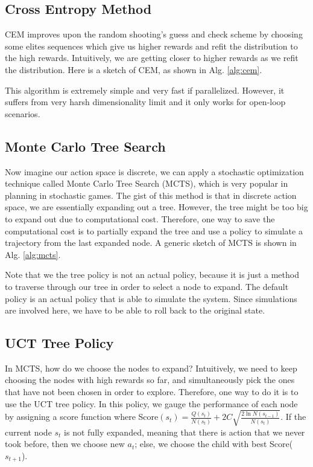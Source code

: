 \subsection{Cross Entropy Method}
CEM improves upon the random shooting's guess and check scheme by choosing some elites sequences which give us higher rewards and refit the distribution to the high rewards. Intuitively, we are getting closer to higher rewards as we refit the distribution. Here is a sketch of CEM, as shown in Alg. \ref{alg:cem}.

This algorithm is extremely simple and very fast if parallelized. However, it suffers from very harsh dimensionality limit and it only works for open-loop scenarios. 
\subsection{Monte Carlo Tree Search}
Now imagine our action space is discrete, we can apply a stochastic optimization technique called Monte Carlo Tree Search (MCTS), which is very popular in planning in stochastic games. The gist of this method is that in discrete action space, we are essentially expanding out a tree. However, the tree might be too big to expand out due to computational cost. Therefore, one way to save the computational cost is to partially expand the tree and use a policy to simulate a trajectory from the last expanded node. A generic sketch of MCTS is shown in Alg. \ref{alg:mcts}.

Note that we the tree policy is not an actual policy, because it is just a method to traverse through our tree in order to select a node to expand. The default policy is an actual policy that is able to simulate the system. Since simulations are involved here, we have to be able to roll back to the original state.
\subsection{UCT Tree Policy}

In MCTS, how do we choose the nodes to expand? Intuitively, we need to keep choosing the nodes with high rewards so far, and simultaneously pick the ones that have not been chosen in order to explore. Therefore, one way to do it is to use the UCT tree policy. In this policy, we gauge the performance of each node by assigning a score function where Score$(s_t) = \frac{Q(s_t)}{N(s_t)}+2C\sqrt{\frac{2\ln{N(s_{t-1})}}{N(s_t)}}$. If the current node $s_t$ is not fully expanded, meaning that there is action that we never took before, then we choose new $a_t$; else, we choose the child with best Score($s_{t+1}$).

